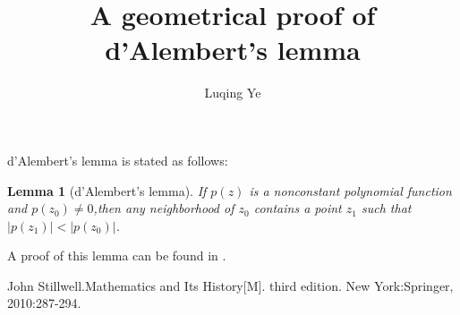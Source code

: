 \documentclass{amsart}
\theoremstyle{plain}
\newtheorem{lemma}[theorem]{Lemma}
\theoremstyle{definition}
\begin{document}
\title{A geometrical proof of d'Alembert's lemma}

\author{Luqing Ye}
\address{College of Science, Hangzhou Normal University,Hangzhou City,Zhejiang Province,China}

\maketitle

\setcounter{tocdepth}{2}


d'Alembert's lemma is stated as follows:
\begin{lemma}[d'Alembert's lemma\cite{JH}]
  If $p(z)$ is a nonconstant polynomial function and $p(z_0)\neq
  0$,then any neighborhood of $z_0$ contains a point $z_1$ such that $|p(z_1)|<|p(z_0)|$.
\end{lemma}

A proof of this lemma can be found in \cite{JH}.



\begin{thebibliography}{1}
John Stillwell.Mathematics and Its History[M]. third edition. New York:Springer, 2010:287-294.
\end{thebibliography}
\end{document}
